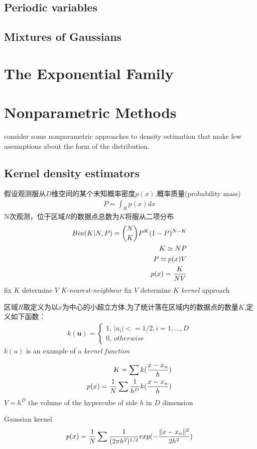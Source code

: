 \documentclass[a4paper]{article}
\begin{document}
\subsection{Periodic variables}

\subsection{Mixtures of Gaussians}
\label{sec:2.3.8}

\section{The Exponential Family}
\label{sec:2.4}

\section{Nonparametric Methods}
\label{sec:2.5}
consider some nonparametric approaches to density estimation that make few assumptions about the form of the distribution.

\subsection{Kernel density estimators}
\label{sec:2.5.1}
假设观测服从$D$维空间的某个末知概率密度$p(x)$,概率质量(probability mass)
\begin{align}
  P = \int_R p(x)dx
\end{align}
N次观测，位于区域$R$的数据点总数为$K$将服从二项分布
\begin{align}
  Bin(K|N,P) = {N \choose K} P^K(1-P)^{N-K}\\
  K \simeq NP\\
  P \simeq p(x)V\\
  p(x) = {K \over NV}
\end{align}
ﬁx $K$ determine $V$ \textit{K-nearest-neighbour}
ﬁx $V$ determine $K$ \textit{kernel} approach

区域$R$取定义为以$x$为中心的小超立方体,为了统计落在区域内的数据点的数量$K$,定义如下函数：
\begin{align}
  k(\mathbf{u}) =
  \begin{cases}
    1,\, |u_i| <= 1/2, i = 1,...,D\\
    0,\, otherwise
  \end{cases}
\end{align}
$k(u)$ is an example of a \textit{kernel function}

\begin{align}
  K = \sum k({x-x_n \over h})\\
  p(x) = {1 \over N} \sum {1 \over h^D} k({x-x_n \over h})
\end{align}
$V = h^D$ the volume of the hypercube of side $h$ in $D$ dimension

Gaussian kernel
\begin{align}
  p(x) = {1 \over N} \sum {1 \over (2 \pi h^2)^{1/2}} exp({- {\|x-x_n\|^2 \over 2h^2 }})
\end{align}
\end{document}
